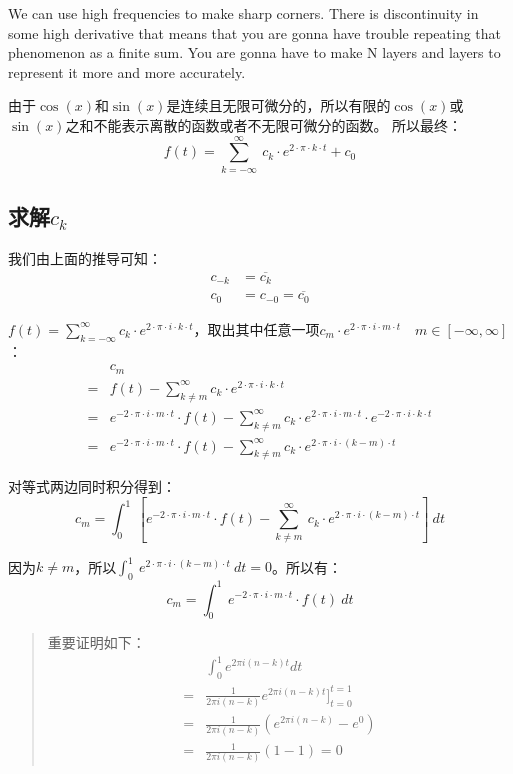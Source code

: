 We can use high frequencies to make sharp corners.
There is discontinuity in some high derivative that means that you are gonna have trouble repeating that phenomenon as a finite sum.
You are gonna have to make N layers and layers to represent it more and more accurately.

由于$\cos(x)$和$\sin(x)$是连续且无限可微分的，所以有限的$\cos(x)$或$\sin(x)$之和不能表示离散的函数或者不无限可微分的函数。
所以最终：
\begin{equation}
	f(t)=\sum\limits_{k=-\infty}^\infty\ c_k\cdot e^{2\cdot \pi\cdot k\cdot t}+c_0
\end{equation}
\subsection{求解$c_k$}
我们由上面的推导可知：
\begin{align*}
	c_{-k} & =\overline{c_k}        \\
	c_0    & =c_{-0}=\overline{c_0}
\end{align*}

$f(t)=\sum\limits_{k=-\infty}^\infty c_k\cdot e^{2\cdot \pi \cdot i \cdot k \cdot t}$，取出其中任意一项$c_m\cdot e^{2\cdot \pi \cdot i\cdot m\cdot t} \quad m\in[-\infty,\infty]$：
\begin{align*}
	  & c_m                                                                                                                                                                 \\
	= & f(t)-\sum\limits_{k\neq m}^\infty c_k\cdot e^{2\cdot \pi\cdot i\cdot k\cdot t}                                                                                      \\
	= & e^{-2\cdot \pi \cdot i\cdot m\cdot t}\cdot f(t)-\sum\limits_{k\neq m}^\infty c_k\cdot e^{2\cdot \pi\cdot i\cdot m\cdot t}\cdot e^{-2\cdot \pi\cdot i\cdot k\cdot t} \\
	= & e^{-2\cdot \pi\cdot i\cdot m\cdot t}\cdot f(t)-\sum\limits_{k\neq m}^\infty c_k\cdot e^{2\cdot \pi\cdot i\cdot (k-m)\cdot t}
\end{align*}

对等式两边同时积分得到：
$$
	c_m=\int_0^1\ [e^{-2\cdot \pi\cdot i\cdot m\cdot t}\cdot f(t)-\sum\limits_{k\neq m}^\infty\ c_k\cdot e^{2\cdot \pi\cdot i\cdot (k-m)\cdot t}]\ dt
$$

因为$k\neq m$，所以$\int_0^1\ e^{2\cdot \pi\cdot i\cdot (k-m)\cdot t}\ dt=0$。所以有：
$$
	c_m=\int_0^1 \ e^{-2\cdot \pi\cdot i\cdot m\cdot t}\cdot f(t)\ dt
$$
\begin{quote}
	重要证明如下：
	\begin{align*}
		  & \int_{0}^{1}e^{2\pi i(n-k)t}dt                          \\
		= & \frac{1}{2\pi i(n-k)}e^{2\pi i(n-k)t}]_{t=0}^{t=1}      \\
		= & \frac{1}{2\pi i(n-k)}\left(e^{2\pi i(n-k)}-e^{0}\right) \\
		= & \frac{1}{2\pi i(n-k)}(1-1)=0
	\end{align*}
\end{quote}

